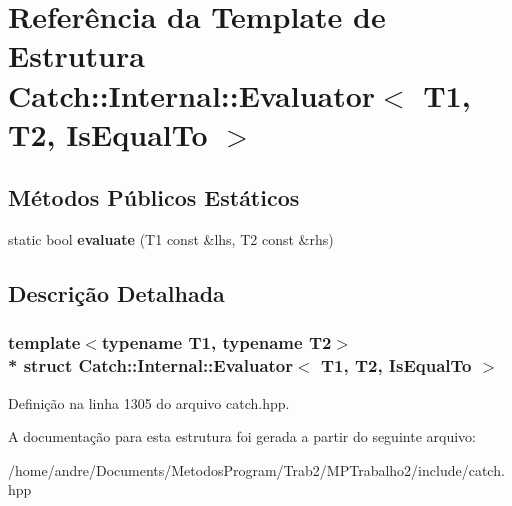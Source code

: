 \hypertarget{structCatch_1_1Internal_1_1Evaluator_3_01T1_00_01T2_00_01IsEqualTo_01_4}{}\section{Referência da Template de Estrutura Catch\+:\+:Internal\+:\+:Evaluator$<$ T1, T2, Is\+Equal\+To $>$}
\label{structCatch_1_1Internal_1_1Evaluator_3_01T1_00_01T2_00_01IsEqualTo_01_4}
\subsection*{Métodos Públicos Estáticos}
\begin{DoxyCompactItemize}
\item 
static bool {\bfseries evaluate} (T1 const \&lhs, T2 const \&rhs)\hypertarget{structCatch_1_1Internal_1_1Evaluator_3_01T1_00_01T2_00_01IsEqualTo_01_4_a166b2b7849247397e63fb2940481b217}{}\label{structCatch_1_1Internal_1_1Evaluator_3_01T1_00_01T2_00_01IsEqualTo_01_4_a166b2b7849247397e63fb2940481b217}

\end{DoxyCompactItemize}


\subsection{Descrição Detalhada}
\subsubsection*{template$<$typename T1, typename T2$>$\\*
struct Catch\+::\+Internal\+::\+Evaluator$<$ T1, T2, Is\+Equal\+To $>$}



Definição na linha 1305 do arquivo catch.\+hpp.



A documentação para esta estrutura foi gerada a partir do seguinte arquivo\+:\begin{DoxyCompactItemize}
\item 
/home/andre/\+Documents/\+Metodos\+Program/\+Trab2/\+M\+P\+Trabalho2/include/catch.\+hpp\end{DoxyCompactItemize}
